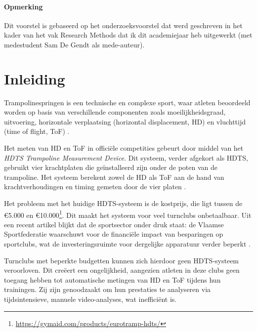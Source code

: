 

\paragraph{Opmerking}

Dit voorstel is gebaseerd op het onderzoeksvoorstel dat werd geschreven in het
kader van het vak Research Methods dat ik dit academiejaar heb
uitgewerkt (met medestudent Sam De Gendt als mede-auteur).

\section{Inleiding}
\label{sec:inleiding}

Trampolinespringen is een technische en complexe sport, waar atleten beoordeeld worden op basis van verschillende componenten zoals moeilijkheidsgraad, uitvoering, horizontale verplaatsing (horizontal displacement, HD) en vluchttijd (time of flight, ToF) \autocite{FTTC2024}.

Het meten van HD en ToF in offici{\"e}le competities gebeurt door middel van het \emph{HDTS Trampoline Measurement Device}. Dit systeem, verder afgekort als HDTS, gebruikt vier krachtplaten die geïnstalleerd zijn onder de poten van de trampoline. Het systeem berekent zowel de HD als ToF aan de hand van krachtverhoudingen en timing gemeten door de vier platen \autocite{Ferger2019}.

Het probleem met het huidige HDTS-systeem is de kostprijs, die ligt tussen de \euro{}5.000 en \euro{}10.000\footnote{\url{https://gymaid.com/products/eurotramp-hdts/}}. Dit maakt het systeem voor veel turnclubs onbetaalbaar. Uit een recent artikel blijkt dat de sportsector onder druk staat: de Vlaamse Sportfederatie waarschuwt voor de financi{\"e}le impact van besparingen op sportclubs, wat de investeringsruimte voor dergelijke apparatuur verder beperkt \autocite{Sporza2025}.

Turnclubs met beperkte budgetten kunnen zich hierdoor geen HDTS-systeem veroorloven. Dit cre{\"e}ert een ongelijkheid, aangezien atleten in deze clubs geen toegang hebben tot automatische metingen van HD en ToF tijdens hun trainingen. Zij zijn genoodzaakt om hun prestaties te analyseren via tijdsintensieve, manuele video-analyses, wat ineffici{\"e}nt is.

